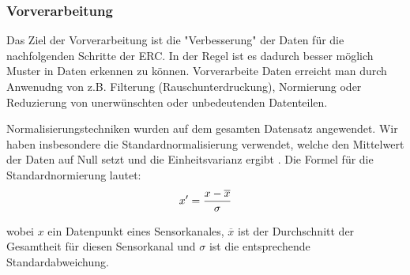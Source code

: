 \subsubsection{Vorverarbeitung} \label{vorverarbeitung-subsubsec}


Das Ziel der Vorverarbeitung ist die "Verbesserung" der Daten für die nachfolgenden Schritte der ERC. In der Regel ist es dadurch besser möglich Muster in Daten erkennen zu können. Vorverarbeite Daten erreicht man durch Anwenudng von z.B. Filterung (Rauschunterdruckung), Normierung oder Reduzierung von unerwünschten oder unbedeutenden Datenteilen. \\



Normalisierungstechniken wurden auf dem gesamten Datensatz angewendet. 
Wir haben insbesondere die Standardnormalisierung verwendet, welche den Mittelwert der Daten auf Null setzt und die Einheitsvarianz ergibt \cite{grus15}. 
Die Formel für die Standardnormierung lautet:
\begin{equation} 
\Large{ {x'={\frac {x-{\overline {x}}}{\sigma }}} } 
\label{equ:norm} \end{equation} %

wobei $ x $ ein Datenpunkt eines Sensorkanales, $ \overline{x} $ ist der Durchschnitt der Gesamtheit für diesen Sensorkanal und $ \sigma $ ist die entsprechende Standardabweichung. \\